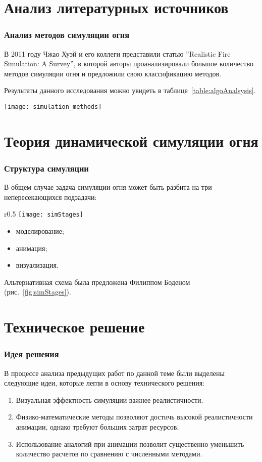 \section{Анализ литературных источников}
\begin{frame}
\frametitle{Анализ методов симуляции огня}
В 2011 году Чжао Хуэй и его коллеги представили статью ''Realistic Fire
Simulation: A Survey'', в которой авторы проанализировали большое количество
методов симуляции огня и предложили свою классификацию методов.

Результаты данного исследования можно увидеть в
таблице~\ref{table:algoAnalsysis}.
\begin{table}[htb]
    \caption{Сравнение производительности различных методов симуляции огня}
    \texttt{[image: simulation\_methods]}%
    \label{table:algoAnalsysis}
\end{table}
\end{frame}

\section{Теория динамической симуляции огня}
\begin{frame}
\frametitle{Структура симуляции}
В общем случае задача симуляции огня может быть разбита на три
непересекающихся подзадачи:
\begin{wrapfigure}{r}{0.5\textwidth}
	\centering
    \texttt{[image: simStages]}
    \caption{Структура симуляции}%
    \label{fig:simStages}
\end{wrapfigure}
\begin{itemize}
	\item моделирование;
	\item анимация;
	\item визуализация.
\end{itemize}
Альтернативная схема была предложена Филиппом Боденом (рис.~\ref{fig:simStages}).
\end{frame}

\section{Техническое решение}
\begin{frame}
\frametitle{Идея решения}
В процессе анализа предыдущих работ по данной теме были выделены следующие идеи,
которые легли в основу технического решения:
\begin{enumerate}
    \item Визуальная эффектность симуляции важнее реалистичности.
    \item Физико-математические методы позволяют достичь высокой реалистичности
        анимации, однако требуют больших затрат ресурсов.
    \item Использование аналогий при анимации позволит существенно
        уменьшить количество расчетов по сравнению с численными методами.
\end{enumerate}
\end{frame}

